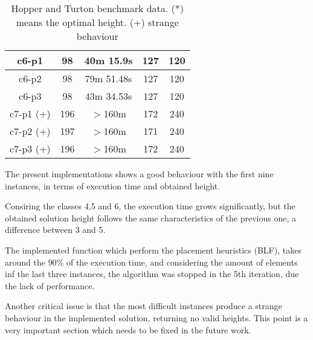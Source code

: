 \begin{table}[h!t]
\begin{tabular}{|c|c|c|c|c|}
        c6-p1             & 98                & 40m 15.9s      & 127             & 120                 \\ \hline
        c6-p2             & 98                & 79m 51.48s     & 127             & 120                 \\ \hline
        c6-p3             & 98                & 43m 34.53s     & 127             & 120                 \\ \hline
        c7-p1 (+)         & 196               & $>$160m        & 172             & 240                 \\ \hline
        c7-p2 (+)         & 197               & $>$160m        & 171             & 240                 \\ \hline
        c7-p3 (+)         & 196               & $>$160m        & 172             & 240                 \\ \hline
    \end{tabular}
    \label{tab:results}
    \caption{Hopper and Turton benchmark data. (*) means the optimal height. (+) strange behaviour}
\end{table}

The present implementations shows a good behaviour with the first nine
instances, in terms of execution time and obtained height.

Consiring the classes 4,5 and 6,
the execution time grows significantly,
but the obtained solution height follows the same characteristics
of the previous one, a difference between 3 and 5.

The implemented function which perform the placement heuristics (BLF),
takes around the $90\%$ of the execution time, and considering the amount of
elements inf the last three instances, the algorithm was stopped in the 5th iteration,
due the lack of performance.

Another critical issue is that the most difficult instances
produce a strange behaviour in the implemented solution,
returning no valid heights. This point is a very important section
which needs to be fixed in the future work.

